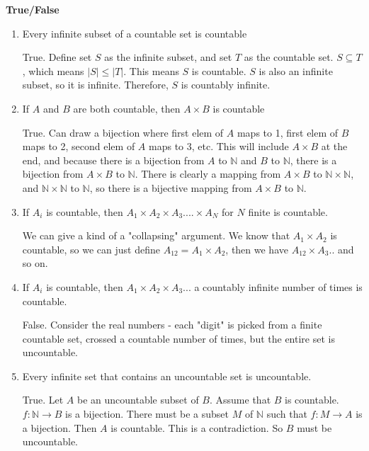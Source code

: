\question \textbf{True/False} 
\begin{enumerate}[label=(\alph*)]
\item Every infinite subset of a countable set is countable
\begin{solution}
True. Define set $S$ as the infinite subset, and set $T$ as the countable set. $S \subseteq T$, which means $|S| \leq |T|$. This means $S$ is countable. $S$ is also an infinite subset, so it is infinite. Therefore, $S$ is countably infinite.
\end{solution}

\item If $A$ and $B$ are both countable, then $A \times B$ is countable
\begin{solution}
True. Can draw a bijection where first elem of $A$ maps to 1, first elem 
of $B$ maps to 2, second elem of $A$ maps to 3, etc. This will include $A \times B$
at the end, and because there is a bijection from $A$ to $\mathbb{N}$ and $B$ to $\mathbb{N}$, there is a bijection from $A \times B$ to $\mathbb{N}$. There is clearly a mapping from 
$A \times B$ to $\mathbb{N} \times \mathbb{N}$, and $\mathbb{N} \times \mathbb{N}$ to $\mathbb{N}$, so there is a 
bijective mapping from $A \times B$ to $\mathbb{N}$. 
\end{solution}
\item If $A_i$ is countable, then $A_1\times A_2\times A_3....\times A_N$ for $N$ finite is countable. 
\begin{solution}
We can give a kind of a "collapsing" argument. We know that $A_1\times A_2$ is countable, so we can just define $A_{12} = A_1\times A_2$, then we have $A_{12} \times A_3..$ and so on. 
\end{solution}
\item If $A_i$ is countable, then $A_1\times A_2\times A_3...$ a countably infinite number of times is countable.
\begin{solution}
False. Consider the real numbers - each "digit" is picked from a finite countable set, crossed a countable number of times, but the entire set is uncountable.
\end{solution}
\item Every infinite set that contains an uncountable set is uncountable. 
\begin{solution}
True.
Let $A$ be an uncountable subset of $B$.
Assume that $B$ is countable.
$f:\mathbb{N} \rightarrow B$ is a bijection.
There must be a subset $M$ of $\mathbb{N}$ such that $f: M \rightarrow A$ is a bijection.
Then $A$ is countable.
This is a contradiction.
So $B$ must be uncountable.
\end{solution}
\end{enumerate}